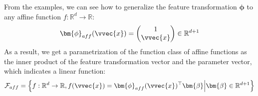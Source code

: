 \documentclass[letterpaper,10pt,english]{jupyterBook}
\begin{document}
\sphinxAtStartPar
From the examples, we can see how to generalize the feature transformation \(\bm\phi\) to any affine function \(f:\mathbb{R}^d\rightarrow \mathbb{R}\):
\begin{align*}
    \bm{\phi}_{aff}(\vvec{x}) = \begin{pmatrix}
    1\\\vvec{x}
    \end{pmatrix}\in\mathbb{R}^{d+1}
\end{align*}
\sphinxAtStartPar
As a result, we get a parametrization of the function class of affine functions as the inner product of the feature transformation vector and the parameter vector, which indicates a linear function:
\begin{equation*}
\begin{split}\mathcal{F}_{aff}=\left\{f:\mathbb{R}^d\rightarrow \mathbb{R}, f(\vvec{x})= \bm{\phi}_{aff}(\vvec{x})^\top\bm{\beta}\middle\vert \bm{\beta}\in\mathbb{R}^{d+1}\right\}
\end{split}
\end{equation*}
\end{document}
